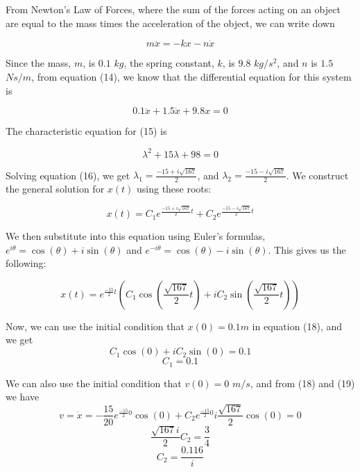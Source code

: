 \documentclass[11pt,answers]{exam}
\begin{document}
\begin{questions}
\begin{solution}
From Newton’s Law of Forces, where the sum of the forces acting on an object are equal to the mass times the acceleration of the object, we can write down

\begin{equation}
m \ddot{x} = -k x - n\dot{x} 
\end{equation}

Since the mass, $m$, is $0.1$ $kg$, the spring constant, $k$, is $9.8$ $kg/s^2$, and $n$ is $1.5$ $Ns/m$, from equation (14), we know that the differential equation for this system is  

\begin{equation}
0.1 \ddot{x} + 1.5\dot{x} +9.8x =0  
\end{equation}

The characteristic equation for (15) is 

\begin{equation}
\lambda^2 + 15\lambda + 98 = 0 
\end{equation}

Solving equation (16), we get $\lambda_{1} =\frac{-15 + i \sqrt{167}}{2}$, and $\lambda_{2} =\frac{-15 - i \sqrt{167}}{2}$. We construct the general solution for $x(t)$ using these roots:

\begin{equation}
x(t) = C_{1}e^{\frac{-15 + i \sqrt{167}}{2} t} + C_{2}e^{\frac{-15 - i \sqrt{167}}{2}t}
\end{equation}

We then substitute into this equation using Euler’s formulas, $e^{i\theta} = \cos{(\theta)} + i\sin{(\theta)}$ and $e^{-i\theta} = \cos{(\theta)} - i\sin{(\theta)}$. This gives us the following:

\begin{equation}
x(t) = e^{\frac{-15}{2} t} ( C_{1}\cos{(\frac{\sqrt{167}}{2} t)} + i C_{2}\sin{(\frac{\sqrt{167}}{2}t)})
\end{equation}

Now, we can use the initial condition that $x(0) = 0.1 m$ in equation (18), and we get
\[
 C_{1}\cos{(0)} + i C_{2}\sin{(0)} = 0.1 
\]
 \begin{equation}
 C_{1}=0.1
 \end{equation}
 
 We can also use the initial condition that $v(0) = 0$ $m/s$, and from (18) and (19)  we have
\[
 v=\dot{x}=-\frac{15}{20} e^{\frac{-15}{2} 0} \cos{(0)} +C_{2}e^{\frac{-15}{2} 0} i \frac{\sqrt{167}}{2} \cos{(0)} = 0
\]
\[
\frac{\sqrt{167} i}{2}  C_{2}= \frac{3}{4}
\]
 \begin{equation}
 C_{2}=\frac{0.116}{i}
 \end{equation}


\end{solution}
\end{questions}
\end{document}
